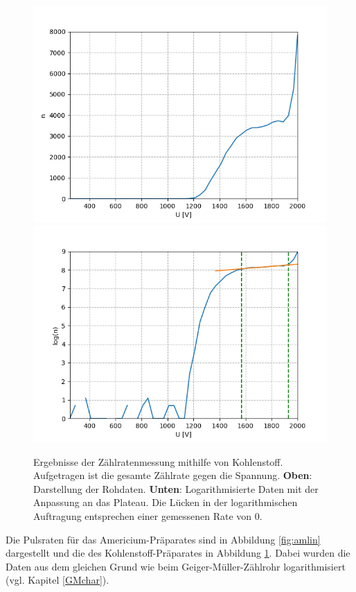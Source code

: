 \documentclass[12pt,a4paper]{article}
\begin{document}
\begin{figure}
\centering
\includegraphics[scale=0.8]{Bilder/Prop/C_lin.PNG}
\includegraphics[scale=0.8]{Bilder/Prop/C_log.PNG}
\caption{Ergebnisse der Zählratenmessung mithilfe von Kohlenstoff. Aufgetragen ist die gesamte Zählrate gegen die Spannung. \textbf{Oben}: Darstellung der Rohdaten. \textbf{Unten}: Logarithmisierte Daten mit der Anpassung an das Plateau. Die Lücken in der logarithmischen Auftragung entsprechen einer gemessenen Rate von 0.}
\label{fig:clin}
\end{figure}

Die Pulsraten für das Americium-Präparates sind in Abbildung  \ref{fig:amlin} dargestellt und die des Kohlenstoff-Präparates in Abbildung \ref{fig:clin}. Dabei wurden die Daten aus dem gleichen Grund wie beim Geiger-Müller-Zählrohr logarithmisiert (vgl. Kapitel \ref{GMchar}).\\
\end{document}
